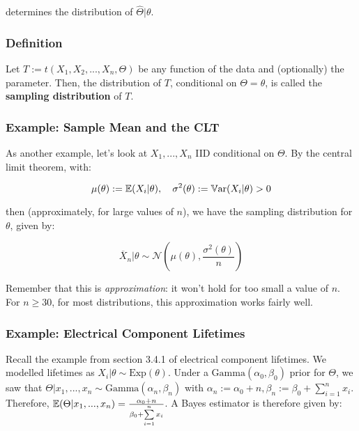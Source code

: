 \documentclass[a4paper]{article}
\begin{document}
            determines the distribution of $\widehat \Theta | \theta$.

            \subsubsection{Definition}
                \begin{definition}
                    Let $T := t(X_1, X_2, ..., X_n, \Theta)$ be any function of
                    the data and (optionally) the parameter. Then, the
                    distribution of $T$, conditional on $\Theta = \theta$, is
                    called the \textbf{sampling distribution} of $T$.
                \end{definition}

            \subsubsection{Example: Sample Mean and the CLT}
                As another example, let's look at $X_1, ..., X_n$ IID
                conditional on $\Theta$. By the central limit theorem, with:

                \[
                    \mu(\theta) := \mathbb{E}(X_i | \theta), \quad \sigma^2(\theta) :=
                    \mathbb{V}\text{ar}(X_i | \theta) > 0
                \]

                then (approximately, for large values of $n$), we have the
                sampling distribution for $\theta$, given by:

                \[
                    \overline X_n | \theta \sim \mathcal{N}\left(\mu(\theta),
                    \frac{\sigma^2(\theta)}{n}\right)
                \]

                \begin{warn}
                    Remember that this is \textit{approximation}: it won't hold
                    for too small a value of $n$. For $n \geq 30$, for most
                    distributions, this approximation works fairly well.
                \end{warn}

            \subsubsection{Example: Electrical Component Lifetimes}
                Recall the example from section 3.4.1 of electrical component
                lifetimes. We modelled lifetimes as $X_i | \theta \sim
                \text{Exp}(\theta)$. Under a $\text{Gamma}(\alpha_0, \beta_0)$
                prior for $\Theta$, we saw that $\Theta | x_1, ..., x_n \sim
                \text{Gamma}(\alpha_n, \beta_n)$ with $\alpha_n := \alpha_0 + n,
                \beta_n := \beta_0 + \sum\limits_{i=1}^n x_i$. Therefore,
                $\mathbb{E}(\Theta | x_1, ..., x_n) = \frac{\alpha_0 + n}{\beta_0 +
                \sum\limits_{i=1}^n x_i}$. A Bayes estimator is therefore given
                by:
\end{document}
